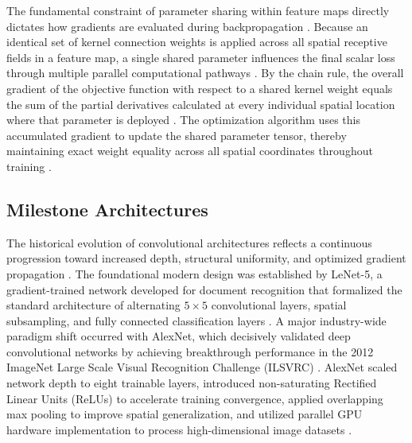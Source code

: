 The fundamental constraint of parameter sharing within feature maps directly dictates how gradients are evaluated during backpropagation \parencite{rumelhart_learning_1986, lecun_backpropagation_1989, lecun_gradient-based_1998}. Because an identical set of kernel connection weights is applied across all spatial receptive fields in a feature map, a single shared parameter influences the final scalar loss through multiple parallel computational pathways \parencite{rumelhart_learning_1986, lecun_backpropagation_1989, lecun_gradient-based_1998}. By the chain rule, the overall gradient of the objective function with respect to a shared kernel weight equals the sum of the partial derivatives calculated at every individual spatial location where that parameter is deployed \parencite{rumelhart_learning_1986, lecun_backpropagation_1989, lecun_gradient-based_1998}. The optimization algorithm uses this accumulated gradient to update the shared parameter tensor, thereby maintaining exact weight equality across all spatial coordinates throughout training \parencite{rumelhart_learning_1986, lecun_backpropagation_1989, lecun_gradient-based_1998}.

\subsection{Milestone Architectures}

The historical evolution of convolutional architectures reflects a continuous progression toward increased depth, structural uniformity, and optimized gradient propagation \parencite{lecun_gradient-based_1998, Krizhevsky_ImageNET, simonyan_very_2014, he_deep_2015}. The foundational modern design was established by LeNet-5, a gradient-trained network developed for document recognition that formalized the standard architecture of alternating $5 \times 5$ convolutional layers, spatial subsampling, and fully connected classification layers \parencite{lecun_gradient-based_1998}. A major industry-wide paradigm shift occurred with AlexNet, which decisively validated deep convolutional networks by achieving breakthrough performance in the 2012 ImageNet Large Scale Visual Recognition Challenge (ILSVRC) \parencite{Krizhevsky_ImageNET}. AlexNet scaled network depth to eight trainable layers, introduced non-saturating Rectified Linear Units (ReLUs) to accelerate training convergence, applied overlapping max pooling to improve spatial generalization, and utilized parallel GPU hardware implementation to process high-dimensional image datasets \parencite{Krizhevsky_ImageNET}.

